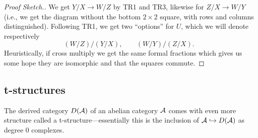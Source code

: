 \documentclass[12pt]{article}
\begin{document}
\begin{proof}[Proof Sketch.]
    We get $Y/X\to W/Z$ by TR1 and TR3, likewise for $Z/X\to W/Y$ (i.e., we get the diagram without the bottom $2\times 2$ square, with rows and columns distinguished). Following TR1, we get two ``options'' for $U$, which we will denote respectively
    \[(W/Z)/(Y/X), \qquad (W/Y)/(Z/X).\]
    Heuristically, if cross multiply we get the same formal fractions which gives us some hope they are isomorphic and that the squares commute.

\end{proof}

\subsection{t-structures}

The derived category $D(\mathcal{A})$ of an abelian category $\mathcal{A}$ comes with even more structure called a t-structure---essentially this is the inclusion of $\mathcal{A}\hookrightarrow D(\mathcal{A})$ as degree 0 complexes.
\end{document}
